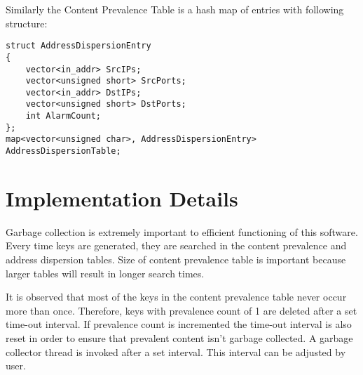 \documentclass{report}
\begin{document}
Similarly the Content Prevalence Table is a hash map of entries with following structure:
\begin{verbatim}
struct AddressDispersionEntry
{
    vector<in_addr> SrcIPs;
    vector<unsigned short> SrcPorts;
    vector<in_addr> DstIPs;
    vector<unsigned short> DstPorts;
    int AlarmCount;
};
map<vector<unsigned char>, AddressDispersionEntry> AddressDispersionTable;
\end{verbatim}


\section{Implementation Details}
Garbage collection is extremely important to efficient functioning of this software. Every time keys are generated, they are searched in the content prevalence and address dispersion tables. Size of content prevalence table is important because larger tables will result in longer search times.

It is observed that most of the keys in the content prevalence table never occur more than once. Therefore, keys with prevalence count of 1 are deleted after a set time-out interval. If prevalence count is incremented the time-out interval is also reset in order to ensure that prevalent content isn't garbage collected. A garbage collector thread is invoked after a set interval. This interval can be adjusted by user.

\nocite{*}

\end{document}
